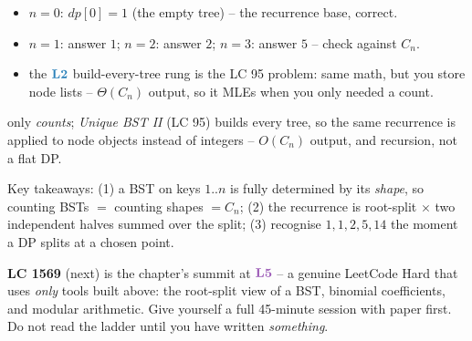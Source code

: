 \begin{itemize}[nosep]
  \item $n=0$: $dp[0]=1$ (the empty tree) -- the recurrence base, correct. \hfill{}
  \item $n=1$: answer $1$; $n=2$: answer $2$; $n=3$: answer $5$ -- check against $C_n$.
  \item the $\lv2$ build-every-tree rung is the LC 95 problem: same math, but you store
        node lists -- $\Theta(C_n)$ output, so it MLEs when you only needed a count.
\end{itemize}

\begin{warningbox}
 only \emph{counts}; \emph{Unique BST II} (LC 95) builds every
tree, so the same recurrence is applied to node objects instead of integers -- $O(C_n)$
output, and recursion, not a flat DP.
\end{warningbox}

\begin{insightbox}
Key takeaways: (1) a BST on keys $1..n$ is fully determined by its \emph{shape}, so
counting BSTs $=$ counting shapes $= C_n$; (2) the recurrence is root-split $\times$
two independent halves summed over the split; (3) recognise $1,1,2,5,14$ the moment a DP
splits at a chosen point.
\end{insightbox}

\begin{attemptgate}
\textbf{LC 1569} (next) is the chapter's summit at $\lv5$ -- a genuine LeetCode Hard
that uses \emph{only} tools built above: the root-split view of a BST, binomial
coefficients, and modular arithmetic. Give yourself a full 45-minute session with
paper first. Do not read the ladder until you have written \emph{something}.
\end{attemptgate}

